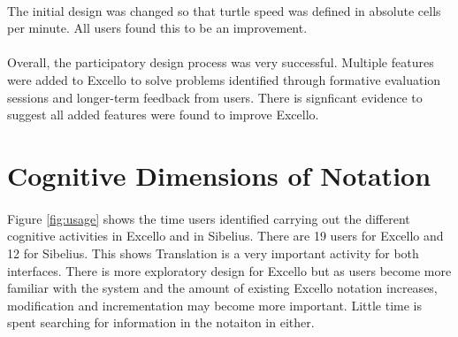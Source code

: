 \paragraph{} The initial design was changed so that turtle speed was defined in absolute cells per minute. All users found this to be an improvement.

\paragraph{} Overall, the participatory design process was very successful. Multiple features were added to Excello to solve problems identified through formative evaluation sessions and longer-term feedback from users. There is signficant evidence to suggest all added features were found to improve Excello.

\section{Cognitive Dimensions of Notation}

\paragraph{} Figure \ref{fig:usage} shows the time users identified carrying out the different cognitive activities \cite{blackwell:tutorial} in Excello and in Sibelius. There are 19 users for Excello and 12 for Sibelius. This shows Translation is a very important activity for both interfaces. There is more exploratory design for Excello but as users become more familiar with the system and the amount of existing Excello notation increases, modification and incrementation may become more important. Little time is spent searching for information in the notaiton in either.

